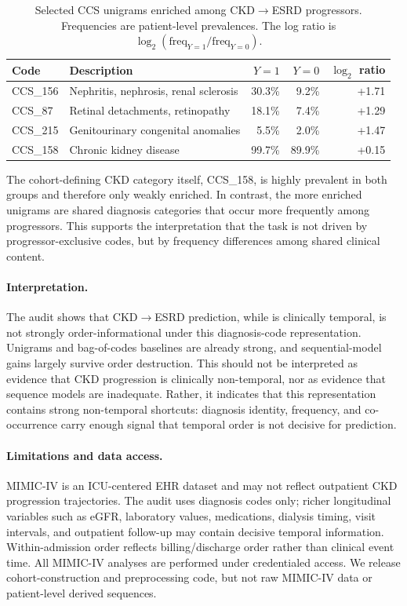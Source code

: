 \documentclass{article}
\theoremstyle{plain}
\theoremstyle{definition}
\theoremstyle{remark}
\begin{document}
\begin{table}[t]
\centering
\caption{Selected CCS unigrams enriched among CKD$\to$ESRD progressors. Frequencies are patient-level prevalences. The log ratio is $\log_2(\mathrm{freq}_{Y=1}/\mathrm{freq}_{Y=0})$.}
\label{tab:mimic_ckd_discriminative_codes}
\small
\begin{tabular}{l l r r r}
\toprule
Code & Description & $Y=1$ & $Y=0$ & $\log_2$ ratio \\
\midrule
CCS\_156 & Nephritis, nephrosis, renal sclerosis & 30.3\% & 9.2\% & +1.71 \\
CCS\_87 & Retinal detachments, retinopathy & 18.1\% & 7.4\% & +1.29 \\
CCS\_215 & Genitourinary congenital anomalies & 5.5\% & 2.0\% & +1.47 \\
\midrule
CCS\_158 & Chronic kidney disease & 99.7\% & 89.9\% & +0.15 \\
\bottomrule
\end{tabular}
\end{table}

The cohort-defining CKD category itself, CCS\_158, is highly prevalent in both groups and therefore only weakly enriched. In contrast, the more enriched unigrams are shared diagnosis categories that occur more frequently among progressors. This supports the interpretation that the task is not driven by progressor-exclusive codes, but by frequency differences among shared clinical content.

\paragraph{Interpretation.}
The audit shows that CKD$\to$ESRD prediction, while is clinically temporal, is not strongly order-informational under this diagnosis-code representation. Unigrams and bag-of-codes baselines are already strong, and sequential-model gains largely survive order destruction. This should not be interpreted as evidence that CKD progression is clinically non-temporal, nor as evidence that sequence models are inadequate. Rather, it indicates that this representation contains strong non-temporal shortcuts: diagnosis identity, frequency, and co-occurrence carry enough signal that temporal order is not decisive for prediction.

\paragraph{Limitations and data access.}
MIMIC-IV is an ICU-centered EHR dataset and may not reflect outpatient CKD progression trajectories. The audit uses diagnosis codes only; richer longitudinal variables such as eGFR, laboratory values, medications, dialysis timing, visit intervals, and outpatient follow-up may contain decisive temporal information. Within-admission order reflects billing/discharge order rather than clinical event time. All MIMIC-IV analyses are performed under credentialed access. We release cohort-construction and preprocessing code, but not raw MIMIC-IV data or patient-level derived sequences.
\end{document}
